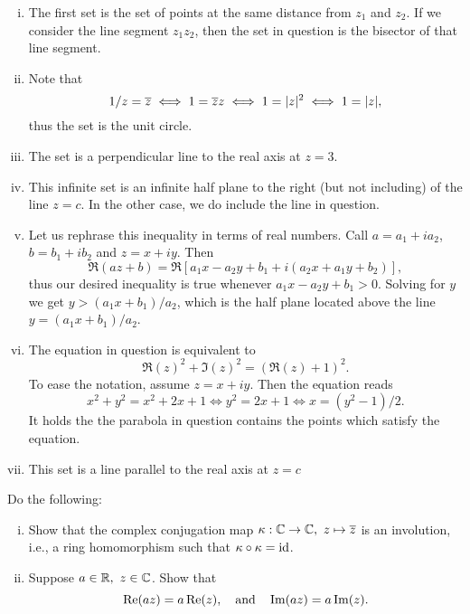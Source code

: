 \documentclass[12pt]{memoir}
\begin{document}
\begin{ptcbr}
    \begin{enumerate}[i)]
        \itemsep=-0.4em
        \item The first set is the set of points at the same distance from $z_1$ and $z_2$. If we consider the line segment $z_1z_2$, then the set in question is the bisector of that line segment.
        \item Note that
        $$1/z=\overline z\iff 1=\overline zz\iff 1=|z|^2\iff 1=|z|,$$
        thus the set is the unit circle.
        \item The set is a perpendicular line to the real axis at $z=3$.
        \item This infinite set is an infinite half plane to the right (but not including) of the line $z=c$. In the other case, we do include the line in question.
        \item Let us rephrase this inequality in terms of real numbers. Call $a=a_1+ia_2$, $b=b_1+ib_2$ and $z=x+iy$. Then 
        $$\Re(az+b)=\Re[a_1 x - a_2 y + b_1 + i (a_2 x +  a_1 y +  b_2)],$$
        thus our desired inequality is true whenever $a_1 x - a_2 y + b_1>0$. Solving for $y$ we get $y>(a_1x+b_1)/a_2$, which is the half plane located above the line $y=(a_1x+b_1)/a_2$.
        \item The equation in question is equivalent to 
        $$\Re(z)^2+\Im(z)^2=(\Re(z)+1)^2.$$
        To ease the notation, assume $z=x+iy$. Then the equation reads 
        $$x^2+y^2=x^2+2x+1\iff y^2=2x+1\iff x=(y^2-1)/2.$$
        It holds the the parabola in question contains the points which satisfy the equation.
        \item This set is a line parallel to the real axis at $z=c$
    \end{enumerate}
\end{ptcbr}

\begin{Ej}
    Do the following:
    \begin{enumerate}[i)]
        \itemsep=-0.4em
        \item Show that the complex conjugation map $\kappa:\mathbb{C}\to\mathbb{C},\ z\mapsto\overline z$ is an involution, i.e., a ring homomorphism such that $\kappa\circ\kappa=\operatorname{id}$.
        \item Suppose $a\in\mathbb{R},\ z\in\mathbb{C}$. Show that 
        $$\Re(az)=a\Re(z),\quad\text{and}\quad\Im(az)=a\Im(z).$$
    \end{enumerate}
\end{Ej}
\end{document}
